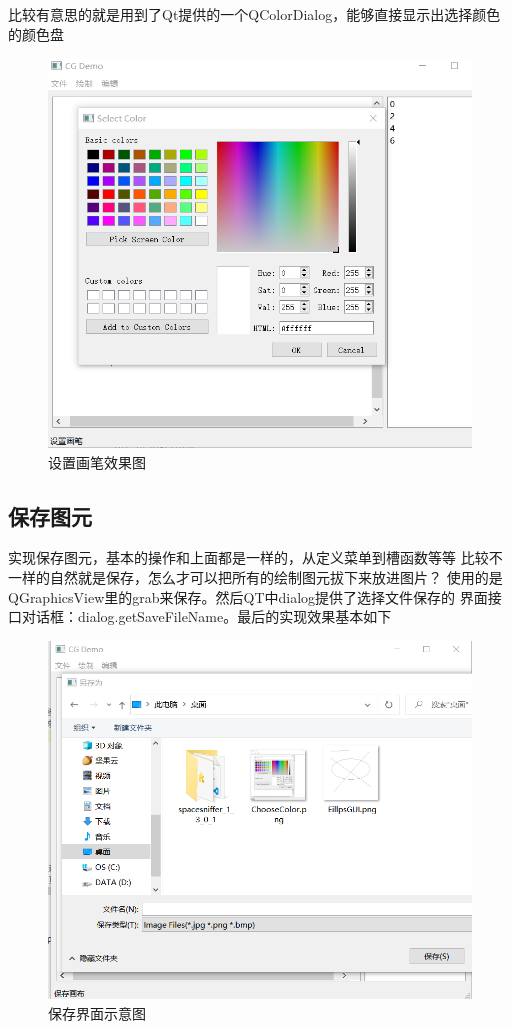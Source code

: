 \documentclass[a4paper,UTF8]{article}
\theoremstyle{definition}
\begin{document}
比较有意思的就是用到了Qt提供的一个QColorDialog，能够直接显示出选择颜色的颜色盘

\begin{figure}[h]
	\centering
	\includegraphics[scale=0.3]{figure/ChooseColor.png}
	\caption{设置画笔效果图}
	\label{fig:EillpsGUI}
\end{figure}


\subsection{保存图元}
实现保存图元，基本的操作和上面都是一样的，从定义菜单到槽函数等等
比较不一样的自然就是保存，怎么才可以把所有的绘制图元拔下来放进图片？
使用的是QGraphicsView里的grab来保存。然后QT中dialog提供了选择文件保存的
界面接口对话框：dialog.getSaveFileName。最后的实现效果基本如下

\begin{figure}[h]
	\centering
	\includegraphics[scale=0.5]{figure/SaveCanvas.png}
	\caption{保存界面示意图}
	\label{fig:SaveCanvas}
\end{figure}
\end{document}
